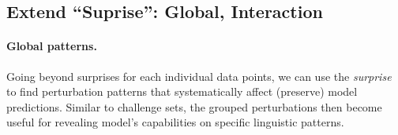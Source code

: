 

\begin{comment}
****
The examples generated by BERT.
****

  P: The quarterback of the UTEP football team is about to be tackled by a member of the Wisconsin defensive team.
  H: The quarterback is about to be tackled by the opposing team.
 Pr: entailment
 NP: Another quarterback is about to be tackled by the opposing team.
NPr: neutral
weight:  0.122
flip_unimportant_feature 0.013 {The}

  P: The quarterback of the UTEP football team is about to be tackled by a member of the Wisconsin defensive team.
  H: The quarterback is about to be tackled by the opposing team.
 Pr: entailment
 NP: Jack is about to be tackled by the opposing team.
NPr: neutral
weight:  0.461
flip_unimportant_feature 0.028 {The, quarterback}


  P: The quarterback of the UTEP football team is about to be tackled by a member of the Wisconsin defensive team.
  H: The quarterback is about to be tackled by the opposing team.
 Pr: entailment
 NP: The quarterback is about to be tackled by someone
NPr: entailment
weight:  0.218
unflip_important_feature 0.3 {team, the, ., opposing}

  P: The quarterback of the UTEP football team is about to be tackled by a member of the Wisconsin defensive team.
  H: The quarterback is about to be tackled by the opposing team.
 Pr: entailment
 NP: The quarterback is about to be tackled by the second team.
NPr: entailment
weight:  0.292
unflip_important_feature 0.149 {opposing}


\end{comment}


\subsection{Extend ``Suprise'': Global, Interaction}
\label{subsec:global_exp}

\paragraph{Global patterns.}
Going beyond surprises for each individual data points, we can use the \emph{surprise} to find perturbation patterns that systematically affect (preserve) model predictions.
Similar to challenge sets, the grouped perturbations then become useful for revealing model's capabilities on specific linguistic patterns.

